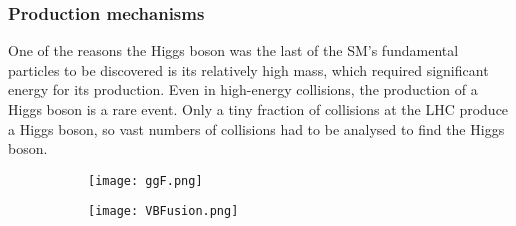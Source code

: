 \subsubsection{\label{subsubsec:Production_mechanisms}Production mechanisms}
\noindent One of the reasons the Higgs boson was the last of the SM’s fundamental particles to be discovered is its relatively high mass, which required significant energy for its production. Even in high-energy collisions, the production of a Higgs boson is a rare event. Only a tiny fraction of collisions at the LHC produce a Higgs boson, so vast numbers of collisions had to be analysed to find the Higgs boson.\\
\begin{figure}[H]
  \centering
  \begin{subfigure}[b]{0.45\textwidth}
    \centering
    \texttt{[image: ggF.png]}
    
    \caption{}
  \end{subfigure}
  \begin{subfigure}[b]{0.45\textwidth}
    \centering
    \texttt{[image: VBFusion.png]}
    
    \caption{}
  \end{subfigure}
  

\end{figure}
